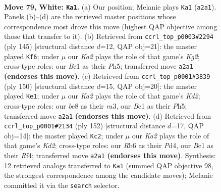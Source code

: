 \documentclass[11pt]{article}
\begin{document}
\clearpage

\begin{figure}[p]\centering
\begin{subfigure}{0.46\textwidth}\centering
\resizebox{\linewidth}{!}{%
\newchessgame
\chessboard[
  setfen={4b1k1/8/1R6/1P6/8/8/K1p3r1/2B5 w - - 1 79},
  showmover=false,
  pgfstyle=straightmove, color=movearrow, markmove={a2-a1}
]}
\caption{}
\end{subfigure}\hfill
\begin{subfigure}{0.46\textwidth}\centering
\resizebox{\linewidth}{!}{%
\newchessgame
\chessboard[
  setfen={8/r4pk1/8/7p/2BR1K1P/8/8/8 b - - 1 73},
  showmover=false,
  pgfstyle=straightmove, color=movearrow, markmove={g7-f6}
]}
\caption{}
\end{subfigure}
\\[4pt]
\begin{subfigure}{0.46\textwidth}\centering
\resizebox{\linewidth}{!}{%
\newchessgame
\chessboard[
  setfen={8/6k1/PR6/7P/8/r4p2/3K4/8 w - - 0 76},
  showmover=false,
  pgfstyle=straightmove, color=movearrow, markmove={d2-e1}
]}
\caption{}
\end{subfigure}\hfill
\begin{subfigure}{0.46\textwidth}\centering
\resizebox{\linewidth}{!}{%
\newchessgame
\chessboard[
  setfen={8/6k1/r7/1R1p4/3P1R2/6r1/3K4/8 w - - 13 77},
  showmover=false,
  pgfstyle=straightmove, color=movearrow, markmove={d2-c2}
]}
\caption{}
\end{subfigure}
\caption{\textbf{Move 79, White: \texttt{Ka1}.} (a) Our position; Melanie plays \texttt{Ka1} (\texttt{a2a1}). Panels (b)--(d) are the retrieved master positions whose correspondence most drove this move (highest QAP objective among those that transfer to it). (b) Retrieved from \texttt{ccrl\_top\_p0003\#2294} (ply 145) [structural distance $d$=12, QAP obj=21]: the master played \texttt{Kf6}; under $\mu$ our \emph{Ka2} plays the role of that game's \emph{Kg2}; cross-type roles: our \emph{B}c1 as their \emph{P}h5; transferred move \texttt{a2a1} \textbf{(endorses this move)}. (c) Retrieved from \texttt{ccrl\_top\_p0001\#3839} (ply 150) [structural distance $d$=15, QAP obj=20]: the master played \texttt{Ke1}; under $\mu$ our \emph{Ka2} plays the role of that game's \emph{Kd2}; cross-type roles: our \emph{b}e8 as their \emph{r}a3, our \emph{B}c1 as their \emph{P}h5; transferred move \texttt{a2a1} \textbf{(endorses this move)}. (d) Retrieved from \texttt{ccrl\_top\_p0001\#2134} (ply 152) [structural distance $d$=17, QAP obj=14]: the master played \texttt{Kc2}; under $\mu$ our \emph{Ka2} plays the role of that game's \emph{Kd2}; cross-type roles: our \emph{R}b6 as their \emph{P}d4, our \emph{B}c1 as their \emph{R}f4; transferred move \texttt{a2a1} \textbf{(endorses this move)}. Synthesis: 12 retrieved analogs transferred to \texttt{Ka1} (summed QAP objective 98, the strongest correspondence among the candidate moves); Melanie committed it via the \texttt{search} selector.}
\label{fig:thought-m156}
\end{figure}
\end{document}
